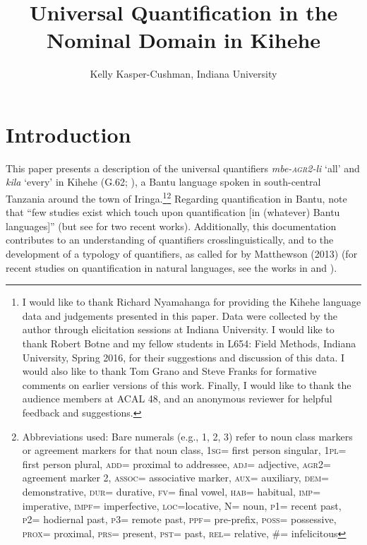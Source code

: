 \documentclass[letterpaper, 12pt]{article}
\title{Universal Quantification in the Nominal Domain in Kihehe}
\author{Kelly Kasper-Cushman, Indiana University}
\begin{document}
\maketitle

\section{Introduction}

This paper presents a description of the universal quantifiers \textit{mbe-\textsc{agr2}-li} `all' and \textit{kila} `every' in Kihehe (G.62; \citealt{maho09}), a Bantu language spoken in south-central Tanzania around the town of Iringa.\footnote{I would like to thank Richard Nyamahanga for providing the Kihehe language data and judgements presented in this paper. Data were collected by the author through elicitation sessions at Indiana University.  I would like to thank Robert Botne and my fellow students in L654: Field Methods, Indiana University, Spring 2016, for their suggestions and discussion of this data. I would also like to thank Tom Grano and Steve Franks for formative comments on earlier versions of this work. Finally, I would like to thank the audience members at ACAL 48, and an anonymous reviewer for helpful feedback and suggestions.}\footnote{Abbreviations used: Bare numerals (e.g., 1, 2, 3) refer to noun class markers or agreement markers for that noun class, \textsc{1sg}= first person singular, \textsc{1pl}= first person plural, \textsc{add}= proximal to addressee, \textsc{adj}= adjective, \textsc{agr2}= agreement marker 2, \textsc{assoc}= associative marker, \textsc{aux}= auxiliary, \textsc{dem}= demonstrative, \textsc{dur}= durative, \textsc{fv}= final vowel, \textsc{hab}= habitual, \textsc{imp}= imperative, \textsc{impf}= imperfective, \textsc{loc}=locative, N= noun, \textsc{p1}= recent past, \textsc{p2}= hodiernal past, \textsc{p3}= remote past, \textsc{ppf}= pre-prefix, \textsc{poss}= possessive, \textsc{prox}= proximal, \textsc{prs}= present, \textsc{pst}= past, \textsc{rel}= relative, \#= infelicitous} Regarding quantification in Bantu, \citealt[p. 383]{zerbian08} note that ``few studies exist which touch upon quantification [in (whatever) Bantu languages]'' (but see \citealt{landman16, landmanip} for two recent works). Additionally, this documentation contributes to an understanding of quantifiers crosslinguistically, and to the development of a typology of quantifiers, as called for by Matthewson (2013) (for recent studies on quantification in natural languages, see the works in \citealt{gil13, keenan12, matthewson08} and \citealt{paperno17}).
\end{document}
